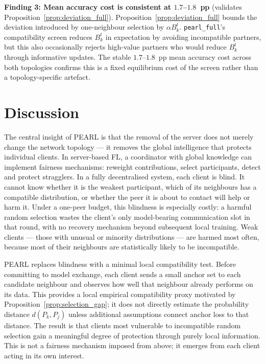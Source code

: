 \documentclass[conference]{IEEEtran}
\newcommand{\rev}[1]{{\color{red}#1}}
\begin{document}
\textbf{Finding 3: Mean accuracy cost is consistent at $1.7$--$1.8$~pp} (validates Proposition~\ref{prop:deviation_full}). Proposition~\ref{prop:deviation_full} bounds the deviation introduced by one-neighbour selection by $\alpha B_k^t$. \texttt{pearl\_full}'s compatibility screen reduces $B_k^t$ in expectation by avoiding incompatible partners, but this also occasionally rejects high-value partners who would reduce $B_k^t$ through informative updates. The stable $1.7$--$1.8$~pp mean accuracy cost across both topologies confirms this is a fixed equilibrium cost of the screen rather than a topology-specific artefact.

\section{Discussion}
\label{sec:discussion}

The central insight of PEARL is that the removal of the server does not merely change the network topology --- it removes the global intelligence that protects individual clients. In server-based FL, a coordinator with global knowledge can implement fairness mechanisms: reweight contributions, select participants, detect and protect stragglers. In a fully decentralised system, each client is blind. It cannot know whether it is the weakest participant, which of its neighbours has a compatible distribution, or whether the peer it is about to contact will help or harm it. Under a one-peer budget, this blindness is especially costly: a harmful random selection wastes the client's only model-bearing communication slot in that round, with no recovery mechanism beyond subsequent local training. Weak clients --- those with unusual or minority distributions --- are harmed most often, because most of their neighbours are statistically likely to be incompatible.

PEARL replaces blindness with a minimal local compatibility test. Before committing to model exchange, each client sends a small anchor set to each candidate neighbour and observes how well that neighbour already performs on its data. \rev{This provides a local empirical compatibility proxy motivated by Proposition~\ref{prop:selection_gap}; it does not directly estimate the probability distance $d(P_k,P_j)$ unless additional assumptions connect anchor loss to that distance.} The result is that clients most vulnerable to incompatible random selection gain a meaningful degree of protection through purely local information. This is not a fairness mechanism imposed from above; it emerges from each client acting in its own interest.
\end{document}
